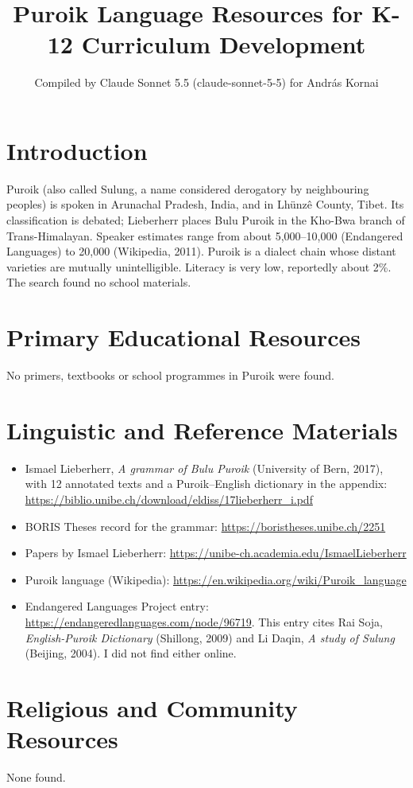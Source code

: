 \documentclass[12pt]{article}
\title{Puroik Language Resources for K-12 Curriculum Development}
\author{Compiled by Claude Sonnet 5.5 (claude-sonnet-5-5) for Andr\'as Kornai}
\date{}
\begin{document}
\maketitle

\section{Introduction}
Puroik (also called Sulung, a name considered derogatory by neighbouring peoples) is spoken in Arunachal Pradesh, India, and in Lh\"unz\^e County, Tibet. Its classification is debated; Lieberherr places Bulu Puroik in the Kho-Bwa branch of Trans-Himalayan. Speaker estimates range from about 5,000--10,000 (Endangered Languages) to 20,000 (Wikipedia, 2011). Puroik is a dialect chain whose distant varieties are mutually unintelligible. Literacy is very low, reportedly about 2\%. The search found no school materials.

\section{Primary Educational Resources}
No primers, textbooks or school programmes in Puroik were found.

\section{Linguistic and Reference Materials}
\begin{itemize}
\item Ismael Lieberherr, \emph{A grammar of Bulu Puroik} (University of Bern, 2017), with 12 annotated texts and a Puroik--English dictionary in the appendix: \url{https://biblio.unibe.ch/download/eldiss/17lieberherr_i.pdf}
\item BORIS Theses record for the grammar: \url{https://boristheses.unibe.ch/2251}
\item Papers by Ismael Lieberherr: \url{https://unibe-ch.academia.edu/IsmaelLieberherr}
\item Puroik language (Wikipedia): \url{https://en.wikipedia.org/wiki/Puroik_language}
\item Endangered Languages Project entry: \url{https://endangeredlanguages.com/node/96719}. This entry cites Rai Soja, \emph{English-Puroik Dictionary} (Shillong, 2009) and Li Daqin, \emph{A study of Sulung} (Beijing, 2004). I did not find either online.
\end{itemize}

\section{Religious and Community Resources}
None found.
\end{document}
